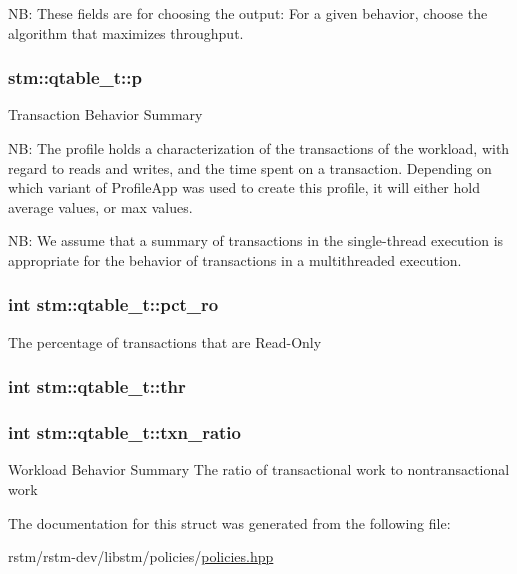 N\-B\-: These fields are for choosing the output\-: For a given behavior, choose the algorithm that maximizes throughput. \hypertarget{structstm_1_1qtable__t_a6980b10f0672b612b6d52556d3649fbf}{
\subsubsection[{p}]{ stm\-::qtable\-\_\-t\-::p}}\label{structstm_1_1qtable__t_a6980b10f0672b612b6d52556d3649fbf}
Transaction Behavior Summary

N\-B\-: The profile holds a characterization of the transactions of the workload, with regard to reads and writes, and the time spent on a transaction. Depending on which variant of Profile\-App was used to create this profile, it will either hold average values, or max values.

N\-B\-: We assume that a summary of transactions in the single-\/thread execution is appropriate for the behavior of transactions in a multithreaded execution. \hypertarget{structstm_1_1qtable__t_a90c4ee712992870b04c4506869e0a1ea}{
\subsubsection[{pct\-\_\-ro}]{\setlength{\rightskip}{0pt plus 5cm}int stm\-::qtable\-\_\-t\-::pct\-\_\-ro}}\label{structstm_1_1qtable__t_a90c4ee712992870b04c4506869e0a1ea}
The percentage of transactions that are Read-\/\-Only \hypertarget{structstm_1_1qtable__t_a6639131b696719510cb2c1d313a3f4cb}{
\subsubsection[{thr}]{\setlength{\rightskip}{0pt plus 5cm}int stm\-::qtable\-\_\-t\-::thr}}\label{structstm_1_1qtable__t_a6639131b696719510cb2c1d313a3f4cb}
\hypertarget{structstm_1_1qtable__t_a3c0bb02f0188050de2b91629d9b1674a}{
\subsubsection[{txn\-\_\-ratio}]{\setlength{\rightskip}{0pt plus 5cm}int stm\-::qtable\-\_\-t\-::txn\-\_\-ratio}}\label{structstm_1_1qtable__t_a3c0bb02f0188050de2b91629d9b1674a}
Workload Behavior Summary The ratio of transactional work to nontransactional work 

The documentation for this struct was generated from the following file\-:\begin{DoxyCompactItemize}
\item 
rstm/rstm-\/dev/libstm/policies/\hyperlink{policies_8hpp}{policies.\-hpp}\end{DoxyCompactItemize}
